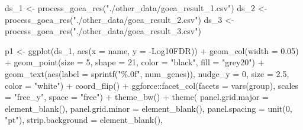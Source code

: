 \documentclass[
  11pt,
  oneside]{book}
\newenvironment{Shaded}{\begin{snugshade}}{\end{snugshade}}
\newcommand{\AttributeTok}[1]{\textcolor[rgb]{0.77,0.63,0.00}{#1}}
\newcommand{\DecValTok}[1]{\textcolor[rgb]{0.00,0.00,0.81}{#1}}
\newcommand{\FloatTok}[1]{\textcolor[rgb]{0.00,0.00,0.81}{#1}}
\newcommand{\FunctionTok}[1]{\textcolor[rgb]{0.00,0.00,0.00}{#1}}
\newcommand{\NormalTok}[1]{#1}
\newcommand{\OtherTok}[1]{\textcolor[rgb]{0.56,0.35,0.01}{#1}}
\newcommand{\SpecialCharTok}[1]{\textcolor[rgb]{0.00,0.00,0.00}{#1}}
\newcommand{\StringTok}[1]{\textcolor[rgb]{0.31,0.60,0.02}{#1}}
\begin{document}
\begin{Shaded}
\begin{Highlighting}[]
\NormalTok{ds\_1 }\OtherTok{\textless{}{-}} \FunctionTok{process\_goea\_res}\NormalTok{(}\StringTok{"./other\_data/goea\_result\_1.csv"}\NormalTok{)}
\NormalTok{ds\_2 }\OtherTok{\textless{}{-}} \FunctionTok{process\_goea\_res}\NormalTok{(}\StringTok{"./other\_data/goea\_result\_2.csv"}\NormalTok{)}
\NormalTok{ds\_3 }\OtherTok{\textless{}{-}} \FunctionTok{process\_goea\_res}\NormalTok{(}\StringTok{"./other\_data/goea\_result\_3.csv"}\NormalTok{)}
\end{Highlighting}
\end{Shaded}

\begin{Shaded}
\begin{Highlighting}[]
\NormalTok{p1 }\OtherTok{\textless{}{-}} \FunctionTok{ggplot}\NormalTok{(ds\_1, }\FunctionTok{aes}\NormalTok{(}\AttributeTok{x =}\NormalTok{ name, }\AttributeTok{y =} \StringTok{\textasciigrave{}}\AttributeTok{{-}Log10FDR}\StringTok{\textasciigrave{}}\NormalTok{)) }\SpecialCharTok{+}
  \FunctionTok{geom\_col}\NormalTok{(}\AttributeTok{width =} \FloatTok{0.05}\NormalTok{) }\SpecialCharTok{+}
  \FunctionTok{geom\_point}\NormalTok{(}\AttributeTok{size =} \DecValTok{5}\NormalTok{, }\AttributeTok{shape =} \DecValTok{21}\NormalTok{, }\AttributeTok{color =} \StringTok{"black"}\NormalTok{, }\AttributeTok{fill =} \StringTok{"grey20"}\NormalTok{) }\SpecialCharTok{+}
  \FunctionTok{geom\_text}\NormalTok{(}\FunctionTok{aes}\NormalTok{(}\AttributeTok{label =} \FunctionTok{sprintf}\NormalTok{(}\StringTok{"\%.0f"}\NormalTok{, num\_genes)), }\AttributeTok{nudge\_y =} \DecValTok{0}\NormalTok{, }\AttributeTok{size =} \FloatTok{2.5}\NormalTok{, }\AttributeTok{color =} \StringTok{"white"}\NormalTok{) }\SpecialCharTok{+}
  \FunctionTok{coord\_flip}\NormalTok{() }\SpecialCharTok{+}
\NormalTok{  ggforce}\SpecialCharTok{::}\FunctionTok{facet\_col}\NormalTok{(}\AttributeTok{facets =} \FunctionTok{vars}\NormalTok{(group), }\AttributeTok{scales =} \StringTok{"free\_y"}\NormalTok{, }\AttributeTok{space =} \StringTok{"free"}\NormalTok{) }\SpecialCharTok{+}
  \FunctionTok{theme\_bw}\NormalTok{() }\SpecialCharTok{+}
  \FunctionTok{theme}\NormalTok{(}
    \AttributeTok{panel.grid.major =} \FunctionTok{element\_blank}\NormalTok{(),}
    \AttributeTok{panel.grid.minor =} \FunctionTok{element\_blank}\NormalTok{(),}
    \AttributeTok{panel.spacing =} \FunctionTok{unit}\NormalTok{(}\DecValTok{0}\NormalTok{, }\StringTok{"pt"}\NormalTok{),}
    \AttributeTok{strip.background =} \FunctionTok{element\_blank}\NormalTok{(),}

\end{Highlighting}
\end{Shaded}
\end{document}
